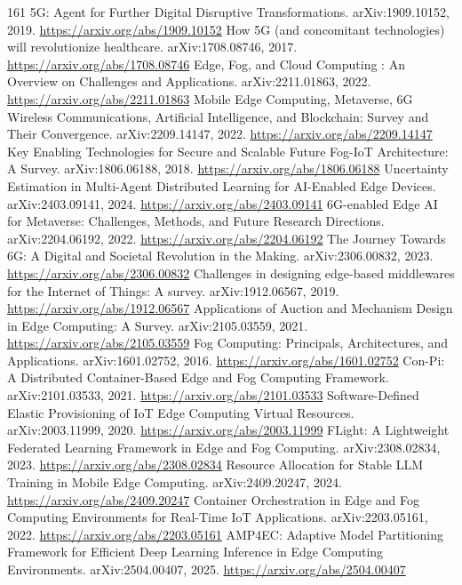 \documentclass[11pt]{article}
\begin{document}
\begin{thebibliography}{161}
 5G: Agent for Further Digital Disruptive Transformations. arXiv:1909.10152, 2019. \url{https://arxiv.org/abs/1909.10152}
 How 5G (and concomitant technologies) will revolutionize healthcare. arXiv:1708.08746, 2017. \url{https://arxiv.org/abs/1708.08746}
 Edge, Fog, and Cloud Computing : An Overview on Challenges and Applications. arXiv:2211.01863, 2022. \url{https://arxiv.org/abs/2211.01863}
 Mobile Edge Computing, Metaverse, 6G Wireless Communications, Artificial Intelligence, and Blockchain: Survey and Their Convergence. arXiv:2209.14147, 2022. \url{https://arxiv.org/abs/2209.14147}
 Key Enabling Technologies for Secure and Scalable Future Fog-IoT Architecture: A Survey. arXiv:1806.06188, 2018. \url{https://arxiv.org/abs/1806.06188}
 Uncertainty Estimation in Multi-Agent Distributed Learning for AI-Enabled Edge Devices. arXiv:2403.09141, 2024. \url{https://arxiv.org/abs/2403.09141}
 6G-enabled Edge AI for Metaverse: Challenges, Methods, and Future Research Directions. arXiv:2204.06192, 2022. \url{https://arxiv.org/abs/2204.06192}
 The Journey Towards 6G: A Digital and Societal Revolution in the Making. arXiv:2306.00832, 2023. \url{https://arxiv.org/abs/2306.00832}
 Challenges in designing edge-based middlewares for the Internet of Things: A survey. arXiv:1912.06567, 2019. \url{https://arxiv.org/abs/1912.06567}
 Applications of Auction and Mechanism Design in Edge Computing: A Survey. arXiv:2105.03559, 2021. \url{https://arxiv.org/abs/2105.03559}
 Fog Computing: Principals, Architectures, and Applications. arXiv:1601.02752, 2016. \url{https://arxiv.org/abs/1601.02752}
 Con-Pi: A Distributed Container-Based Edge and Fog Computing Framework. arXiv:2101.03533, 2021. \url{https://arxiv.org/abs/2101.03533}
 Software-Defined Elastic Provisioning of IoT Edge Computing Virtual Resources. arXiv:2003.11999, 2020. \url{https://arxiv.org/abs/2003.11999}
 FLight: A Lightweight Federated Learning Framework in Edge and Fog Computing. arXiv:2308.02834, 2023. \url{https://arxiv.org/abs/2308.02834}
 Resource Allocation for Stable LLM Training in Mobile Edge Computing. arXiv:2409.20247, 2024. \url{https://arxiv.org/abs/2409.20247}
 Container Orchestration in Edge and Fog Computing Environments for Real-Time IoT Applications. arXiv:2203.05161, 2022. \url{https://arxiv.org/abs/2203.05161}
 AMP4EC: Adaptive Model Partitioning Framework for Efficient Deep Learning Inference in Edge Computing Environments. arXiv:2504.00407, 2025. \url{https://arxiv.org/abs/2504.00407}

\end{thebibliography}
\end{document}
